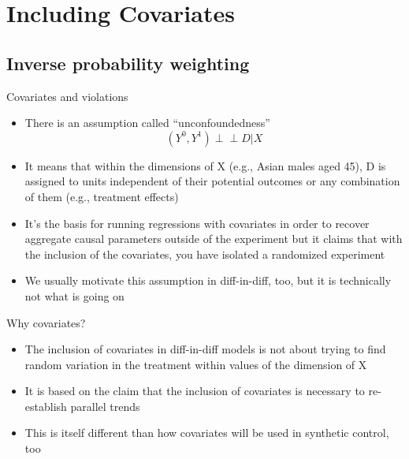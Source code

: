 \documentclass{beamer}
\begin{document}





\section{Including Covariates}

\subsection{Inverse probability weighting}

\begin{frame}{Covariates and violations}

\begin{itemize}
\item There is an assumption called ``unconfoundedness'' $$( Y^0, Y^1 ) \perp\!\!\!\perp D | X $$
\item It means that within the dimensions of X (e.g., Asian males aged 45), D is assigned to units independent of their potential outcomes or any combination of them (e.g., treatment effects)
\item It's the basis for running regressions with covariates in order to recover aggregate causal parameters outside of the experiment but it claims that with the inclusion of the covariates, you have isolated a randomized experiment
\item We usually motivate this assumption in diff-in-diff, too, but it is technically not what is going on

\end{itemize}

\end{frame}

\begin{frame}{Why covariates?}

\begin{itemize}

\item The inclusion of covariates in diff-in-diff models is not about trying to find random variation in the treatment within values of the dimension of X
\item It is based on the claim that the inclusion of covariates is necessary to re-establish parallel trends
\item This is itself different than how covariates will be used in synthetic control, too
\end{itemize}

\end{frame}
\end{document}
